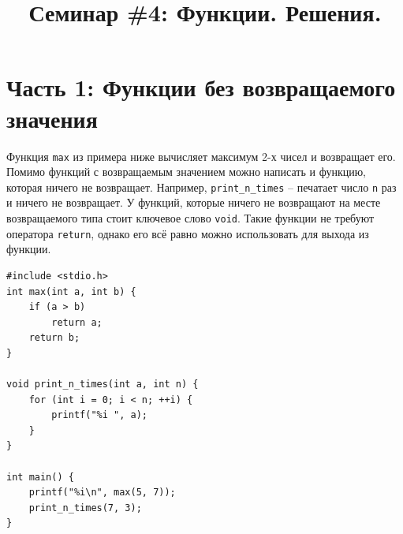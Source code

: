 \documentclass{article}
\begin{document}



\title{Семинар \#4: Функции. Решения. \vspace{-5ex}}\date{}\maketitle
\section*{Часть 1: Функции без возвращаемого значения}
Функция \texttt{max} из примера ниже вычисляет максимум 2-х чисел и возвращает его.\\

Помимо функций с возвращаемым значением можно написать и функцию, которая ничего не возвращает. Например, \texttt{print\_n\_times} -- печатает число \texttt{n} раз и ничего не возвращает. У функций, которые ничего не возвращают на месте возвращаемого типа стоит ключевое слово \texttt{void}. Такие функции не требуют оператора \texttt{return}, однако его всё равно можно использовать для выхода из функции.
\begin{lstlisting}
#include <stdio.h>
int max(int a, int b) {
    if (a > b)
        return a;
    return b;
}

void print_n_times(int a, int n) {
    for (int i = 0; i < n; ++i) {
        printf("%i ", a);
    }
}

int main() {
    printf("%i\n", max(5, 7));
    print_n_times(7, 3);
}
\end{lstlisting}
\end{document}
